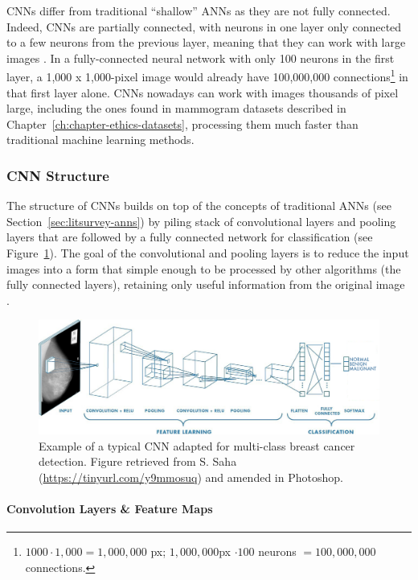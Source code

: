CNNs differ from traditional ``shallow'' ANNs as they are not fully connected. Indeed, CNNs are partially connected, with neurons in one layer only connected to a few neurons from the previous layer, meaning that they can work with large images \citep{Geron2019}. In a fully-connected neural network with only 100 neurons in the first layer, a 1,000 x 1,000-pixel image would already have 100,000,000 connections\footnote{$1000 \cdot 1,000 = 1,000,000$ px; $1,000,000$px $\cdot 100$ neurons $= 100,000,000$ connections.} in that first layer alone. CNNs nowadays can work with images thousands of pixel large, including the ones found in mammogram datasets described in Chapter~\ref{ch:chapter-ethics-datasets}, processing them much faster than traditional machine learning methods.

\subsubsection{CNN Structure}

The structure of CNNs builds on top of the concepts of traditional ANNs (see Section~\ref{sec:litsurvey-anns}) by piling stack of convolutional layers and pooling layers that are followed by a fully connected network for classification (see Figure~\ref{fig:litsurvey-CNN-example}). The goal of the convolutional and pooling layers is to reduce the input images into a form that simple enough to be processed by other algorithms (the fully connected layers), retaining only useful information from the original image \citep{Shen2017}.

\begin{figure}[ht]
\centerline{\includegraphics[width=\textwidth]{Dissertation/figures/litsurvey/CNN example.png}}
\caption{\label{fig:litsurvey-CNN-example}Example of a typical CNN adapted for multi-class breast cancer detection. Figure retrieved from S. Saha (\url{https://tinyurl.com/y9mmosuq}) and amended in Photoshop.}
\end{figure}

\paragraph{Convolution Layers \& Feature Maps}

